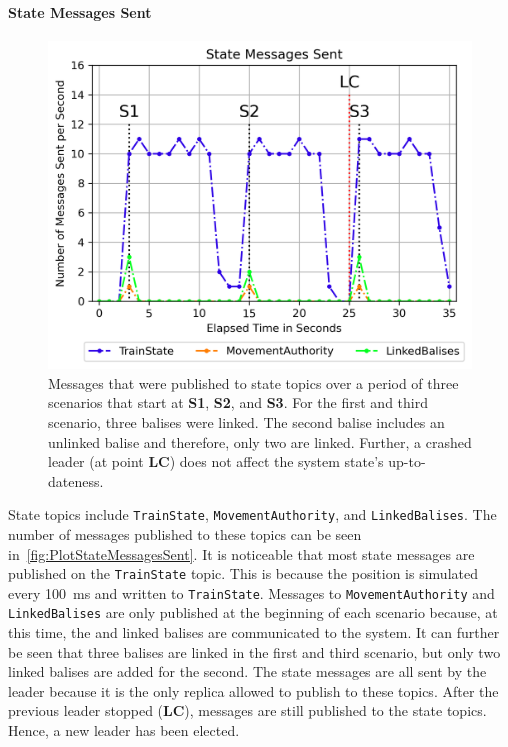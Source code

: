 \paragraph{State Messages Sent}

\begin{figure}[!htb]
	\centering
	\includegraphics[width=0.8\linewidth]{images/plots/StateMessagesSent}
	\caption{Messages that were published to state topics over a period of three scenarios that start at \textbf{S1}, \textbf{S2}, and \textbf{S3}. For the first and third scenario, three balises were linked. The second balise includes an unlinked balise and therefore, only two are linked. Further, a crashed leader (at point \textbf{LC}) does not affect the system state's up-to-dateness.}
	\label{fig:PlotStateMessagesSent}
\end{figure}

State topics include \texttt{TrainState}, \texttt{MovementAuthority}, and \texttt{LinkedBalises}.
The number of messages published to these topics can be seen in~\autoref{fig:PlotStateMessagesSent}.
It is noticeable that most state messages are published on the \texttt{TrainState} topic.
This is because the position is simulated every 100~ms and written to \texttt{TrainState}.
Messages to \texttt{MovementAuthority} and \texttt{LinkedBalises} are only published at the beginning of each scenario because, at this time, the  and linked balises are communicated to the system.
It can further be seen that three balises are linked in the first and third scenario, but only two linked balises are added for the second.
The state messages are all sent by the leader because it is the only replica allowed to publish to these topics.
After the previous leader stopped (\textbf{LC}), messages are still published to the state topics.
Hence, a new leader has been elected.

